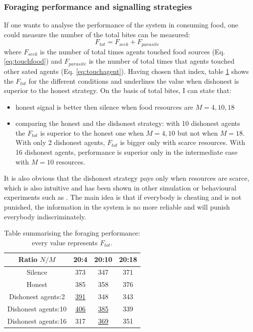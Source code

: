 \subsubsection{Foraging performance and signalling strategies}
If one wants to analyse the performance of the system in consuming food,
one could measure the number of the total bites can be measured:
\begin{equation}
 F_{tot}=F_{seek}+F_{parasite} \label{social:totbites}
\end{equation}
where $F_{seek}$ is the number of total times agents touched food sources (Eq. \ref{eq:touchfood})
and $F_{parasite}$ is the number of total times that agents touched other sated agents (Eq. \ref{eq:touchagent}).
Having chosen that index, table \ref{tab:totalPerformance} shows the $F_{tot}$ 
for the different conditions and underlines the value when dishonest is superior to 
the honest strategy.
On the basis of total bites, I can state that:
\begin{itemize}
\item honest signal is better then silence when food resources are $M=4,10,18$
\item comparing the honest and the dishonest strategy:
with 10 dishonest agents the $F_{tot}$ is superior to the honest one when $M=4,10$
but not when $M=18$. With only 2 dishonest agents, $F_{tot}$ is bigger only with scarce resources.
With 16 dishonest agents, performance is superior only in the intermediate case with $M=10$ resources.
\end{itemize}
It is also obvious that the dishonest strategy pays only when resources are scarce, 
which is also intuitive and has been shown in other simulation or
behavioural experiments such as \citet{Brembs1996:CheatingPrisonerDilemma,Schwieren2010:CompetitionCheating}.
The main idea is that if everybody is cheating and is not punished, the information
in the system is no more reliable and will punish everybody indiscriminately.

\begin{table}[htbp]
\caption[Social System foraging performance]{
Table summarising the foraging performance: every value represents $F_{tot}$. \label{tab:totalPerformance}}
\begin{center}
\small{
\begin{tabular}{@{}c|ccc@{}}
\hline
Ratio $N/M$ & 20:4 & 20:10 & 20:18\\
\hline
Silence & 373 & 347 & 371\\
\hline
Honest & 385 & 358 & 376\\
\hline
Dishonest agents:2 & \underline{391} & 348 & 343\\
Dishonest agents:10 & \underline{406} & \underline{385} & 339 \\
Dishonest agents:16 & 317 & \underline{369} & 351\\
\end{tabular}
}
\end{center}
\end{table}

